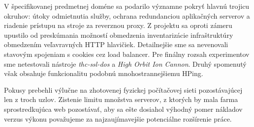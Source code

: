 \documentclass[12pt, a4paper]{article}
\begin{document}
V špecifikovanej predmetnej doméne sa podarilo významne pokryť hlavnú trojicu okruhov: 
útoky odmietnutia služby, ochrana redundanciou aplikačných serverov a riadenie prístupu na stroje 
za reverznou proxy. Z projektu sa oproti zámeru upustilo od preskúmania možností obmedzenia inventarizácie 
infraštruktúry obmedzením veľavravných HTTP hlavičiek. Detailnejšie sme sa nevenovali stavovým spojeniam s 
cookies cez load balancer. Pre finálny rozsah experimentov sme netestovali nástroje \emph{thc-ssl-dos} a 
\emph{High Orbit Ion Cannon}. Druhý spomenutý však obsahuje funkcionalitu podobnú mnohostrannejšiemu HPing. 

Pokusy prebehli výlučne na zhotovenej fyzickej počítačovej sieti pozostávajúcej len z troch uzlov.
Zistenie limitu množstva serverov, z ktorých by mala farma sprostredkujúca web pozostávať, aby sa ešte
dosiahol výhodný pomer nákladov verzus výkonu považujeme za najzaujímavejšie potenciálne
rozšírenie práce.
\newpage
{}
\printbibliography[title={Literatúra}]
\end{document}
